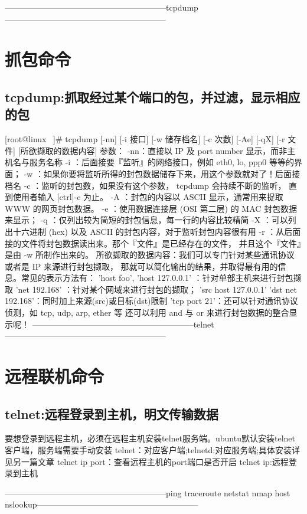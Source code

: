 \documentclass[a4paper,left=1.5cm,right=1.5cm,11pt]{article}
\begin{document}
-----------------------------------------------------------tcpdump-----------------------------------------------------------
\section{抓包命令}
\subsection{tcpdump:抓取经过某个端口的包，并过滤，显示相应的包}
[root@linux ~]# tcpdump [-nn] [-i 接口] [-w 储存档名] [-c 次数] [-Ae]
                        [-qX] [-r 文件] [所欲撷取的数据内容]
参数：
-nn：直接以 IP 及 port number 显示，而非主机名与服务名称
-i ：后面接要『监听』的网络接口，例如 eth0, lo, ppp0 等等的界面；
-w ：如果你要将监听所得的封包数据储存下来，用这个参数就对了！后面接档名
-c ：监听的封包数，如果没有这个参数， tcpdump 会持续不断的监听，
     直到使用者输入 [ctrl]-c 为止。
-A ：封包的内容以 ASCII 显示，通常用来捉取 WWW 的网页封包数据。
-e ：使用数据连接层 (OSI 第二层) 的 MAC 封包数据来显示；
-q ：仅列出较为简短的封包信息，每一行的内容比较精简
-X ：可以列出十六进制 (hex) 以及 ASCII 的封包内容，对于监听封包内容很有用
-r ：从后面接的文件将封包数据读出来。那个『文件』是已经存在的文件，
     并且这个『文件』是由 -w 所制作出来的。
所欲撷取的数据内容：我们可以专门针对某些通讯协议或者是 IP 来源进行封包撷取，
     那就可以简化输出的结果，并取得最有用的信息。常见的表示方法有：
     'host foo', 'host 127.0.0.1' ：针对单部主机来进行封包撷取
     'net 192.168' ：针对某个网域来进行封包的撷取；
     'src host 127.0.0.1' 'dst net 192.168'：同时加上来源(src)或目标(dst)限制
     'tcp port 21'：还可以针对通讯协议侦测，如 tcp, udp, arp, ether 等
     还可以利用 and 与 or 来进行封包数据的整合显示呢！
-----------------------------------------------------------telnet-----------------------------------------------------------
\section{远程联机命令}
\subsection{telnet:远程登录到主机，明文传输数据}
要想登录到远程主机，必须在远程主机安装telnet服务端。ubuntu默认安装telnet客户端，服务端需要手动安装
telnet：对应客户端;telnetd:对应服务端;具体安装详见另一篇文章
telnet ip port：查看远程主机的port端口是否开启
telnet ip:远程登录到主机

-----------------------------------------------------------ping traceroute netstat nmap host nslookup-----------------------------------------------------------
\end{document}
